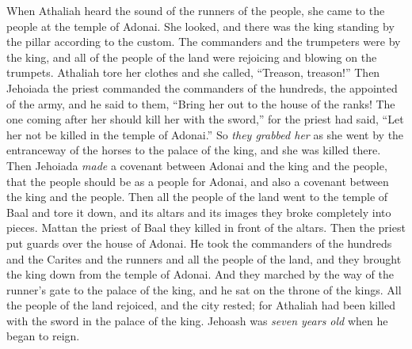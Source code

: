 \begin{biblechapter}
\verse When Athaliah heard the sound of the runners of the people, she came to the people at the temple of Adonai.
\verse She looked, and there was the king standing by the pillar according to the custom. The commanders and the trumpeters were by the king, and all of the people of the land were rejoicing and blowing on the trumpets. Athaliah tore her clothes and she called, “Treason, treason!”
\verse Then Jehoiada the priest commanded the commanders of the hundreds, the appointed of the army, and he said to them, “Bring her out to the house of the ranks! The one coming after her should kill her with the sword,” for the priest had said, “Let her not be killed in the temple of Adonai.”
\verse So \textit{they grabbed her} as she went by the entranceway of the horses to the palace of the king, and she was killed there.
\verse Then Jehoiada \textit{made} a covenant between Adonai and the king and the people, that the people should be as a people for Adonai, and also a covenant between the king and the people.
\verse Then all the people of the land went to the temple of Baal and tore it down, and its altars and its images they broke completely into pieces. Mattan the priest of Baal they killed in front of the altars. Then the priest put guards over the house of Adonai.
\verse He took the commanders of the hundreds and the Carites and the runners and all the people of the land, and they brought the king down from the temple of Adonai. And they marched by the way of the runner’s gate to the palace of the king, and he sat on the throne of the kings.
\verse All the people of the land rejoiced, and the city rested; for Athaliah had been killed with the sword in the palace of the king.
\verse {} Jehoash was \textit{seven years old} when he began to reign.
\end{biblechapter}

